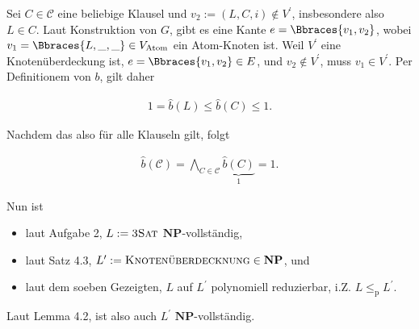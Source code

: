 \begin{solution}
Sei $C \in \mathcal C$ eine beliebige Klausel und $v_2 := (L, C, i) \not \in V^\prime$, insbesondere also $L \in C$.
Laut Konstruktion von $G$, gibt es eine Kante $e = \Bbraces{v_1, v_2}$, wobei $v_1 = \Bbraces{L, \_, \_} \in V_\text{Atom}$ ein Atom-Knoten ist.
Weil $V^\prime$ eine Knotenüberdeckung ist, $e = \Bbraces{v_1, v_2} \in E$, und $v_2 \not \in V^\prime$, muss $v_1 \in V^\prime$.
Per Definitionem von $b$, gilt daher

\begin{align*}
    1 = \hat b(L) \leq \hat b(C) \leq 1.
\end{align*}

Nachdem das also für alle Klauseln gilt, folgt

\begin{align*}
    \hat b(\mathcal C)
    =
    \bigwedge_{C \in \mathcal C}
        \underbrace{\hat b(C)}_1
    =
    1.
\end{align*}

Nun ist

\begin{itemize}
    \item laut Aufgabe 2, $L := \textsc{3Sat}$ $\mathbf{NP}$-vollständig,
    \item laut Satz 4.3, $L^\prime := \textsc{Knotenüberdecknung} \in \mathbf{NP}$, und
    \item laut dem soeben Gezeigten, $L$ auf $L^\prime$ polynomiell reduzierbar, i.Z. $L \leq_\mathrm{p} L^\prime$.
\end{itemize}

Laut Lemma 4.2, ist also auch $L^\prime$ $\mathbf{NP}$-vollständig.

\end{solution}


